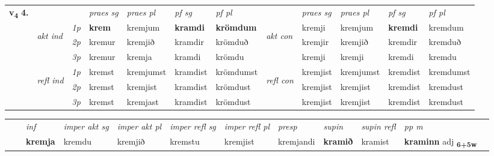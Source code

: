 \begin{tabular}{llllllllllll} \toprule
\multirow{4}{*}{{{\textbf{v{\textsubscript{4}}} \Large{\textbf{4.}}}}}  & &   &  \textit{praes sg}  & \textit{praes pl}  &\textit{ pf sg} & \textit{pf pl} &  &  \textit{praes sg}  & \textit{praes pl}  & \textit{pf sg} & \textit{pf pl } \\*
	\cmidrule{4-7} \cmidrule{9-12}
 & \multirow{3}{*}{\begin{turn}{90}\textit{akt ind}\end{turn}} & {\textit{1p}} & \textbf{krem} & kremjum    & \textbf{kramdi} & \textbf{krömdum} & \multirow{3}{*}{\begin{turn}{90}\textit{akt con}\end{turn}} &kremji & kremjum & \textbf{kremdi} & kremdum\\*
& &  {\textit{2p}} &  kremur  & kremjið   & kramdir & krömduð & & kremjir & kremjið & kremdir & kremduð \\*
& &  {\textit{3p}} & kremur & kremja   & kramdi & krömdu & & kremji & kremji& kremdi & kremdu  \\*
\cmidrule{4-7} \cmidrule{9-12}
 &\multirow{3}{*}{\begin{turn}{90}\textit{refl ind}\end{turn}} & {\textit{1p}} & kremst & kremjumst    & kramdist & krömdumst & \multirow{3}{*}{\begin{turn}{90}\textit{refl con}\end{turn}}  &kremjist & kremjumst & kremdist & kremdumst\\*
 &&  {\textit{2p}} &  kremst  & kremjist   & kramdist & krömdust & &kremjist & kremjist & kremdist & kremdust \\*
& &  {\textit{3p}} & kremst & kremjast   & kramdist & krömdust & & kremjist & kremjist& kremdist & kremdust  \\*
\cmidrule{4-7} \cmidrule{9-12}
\end{tabular}


\begin{tabular}{llllllllllll}
 & & \textit{inf} & \textit{imper akt sg} & \textit{imper akt pl} & \textit{imper refl sg} & \textit{imper refl pl} & \textit{presp} & \textit{supin} & \textit{supin refl} & \textit{pp m}     \\*
  & & \textbf{kremja} & kremdu  & kremjið & kremstu & kremjist & kremjandi &  \textbf{kramið} & kramist & \textbf{kraminn} adj \textbf{\textsubscript{6+5w}} \\*
\cmidrule{1-12}
\end{tabular}



